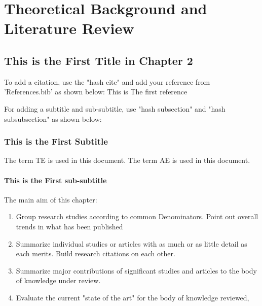 \chapter{Theoretical Background and Literature Review}
\vspace{2em}
\section{This is the First Title in Chapter 2}

To add a citation, use the "hash cite" and add your reference from 'References.bib' as shown below:
This is The first reference \cite{yao2024survey}

For adding a subtitle and sub-subtitle, use "hash subsection" and "hash subsubsection" as shown below: 

\subsection{This is the First Subtitle}

The term \ac{TE} is used in this document.
The term \ac{AE} is used in this document.

\subsubsection{This is the First sub-subtitle}

The  main aim of this chapter:
\begin{enumerate}
    \item Group research studies according to common Denominators. Point out overall trends in what has been published
    \item Summarize individual studies or articles with as much or as little detail as each merits. Build research citations on each other.
    \item  Summarize major contributions of significant studies and articles to the body of knowledge under review.
    \item Evaluate the current "state of the art" for the body of knowledge reviewed,
\end{enumerate}